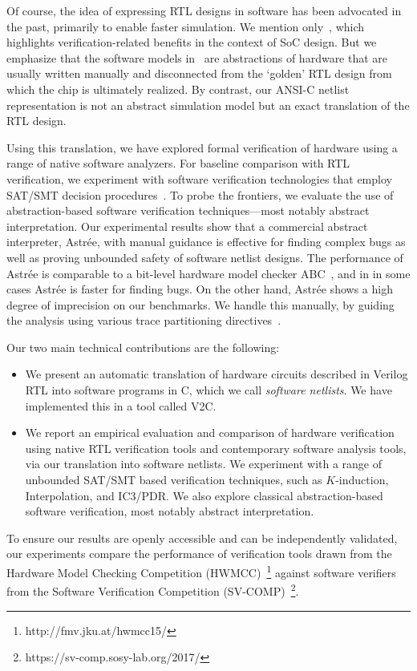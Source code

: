 Of course, the idea of expressing RTL designs in software has been  advocated in the past, primarily to enable faster simulation. We mention only~\cite{soc-keating}, which highlights verification-related benefits in the context of SoC design.  But we emphasize that the software models in~\cite{soc-keating} are abstractions of hardware that are usually written manually and disconnected from the `golden' RTL design  from which the chip is ultimately realized.  By contrast, our ANSI-C netlist representation is not an abstract simulation model but an exact translation of the RTL design.

Using this translation, we have explored formal verification of hardware using a range of 
native software analyzers.  For baseline comparison with RTL verification, we experiment with software verification technologies that employ SAT/SMT decision procedures~\cite{DBLP:conf/cav/BeyerK11,2ls,cbmc.tacas:2004,DBLP:conf/tacas/HeizmannDGLMSP16}. To 
probe the frontiers, we evaluate the use of abstraction-based software verification 
techniques---most notably abstract interpretation. Our experimental results show that a commercial abstract interpreter,  Astr{\'e}e, with manual guidance is effective for finding complex bugs 
as well as proving unbounded safety of software netlist designs. The performance of Astr{\'e}e is 
comparable to a bit-level hardware model checker ABC~\cite{abc}, and in 
in some cases Astr{\'e}e is faster for finding bugs.  On the other hand, 
Astr{\'e}e shows a high degree of imprecision on our benchmarks. We handle this 
manually, by guiding the analysis using various trace 
partitioning directives~\cite{DBLP:journals/toplas/RivalM07}.  

Our two main technical contributions are the following:
%
\begin{itemize}
\item We present an automatic translation of hardware circuits described in Verilog RTL into software 
programs in C, which we call \textit{software netlists}.  We have implemented this in a tool called V2C.  

\item We report an empirical evaluation and comparison of hardware verification using native RTL verification tools and contemporary software analysis tools, via our translation into software netlists. 
We experiment with a range of unbounded SAT/SMT based verification techniques, 
such as $K$-induction, Interpolation, and IC3/PDR. We also explore classical abstraction-based 
software verification, most notably abstract interpretation.
\end{itemize}

\noindent To ensure our results are openly accessible and can be independently validated, our experiments compare the performance of verification tools drawn from  the Hardware Model Checking Competition (HWMCC)~\footnote{http://fmv.jku.at/hwmcc15/} against software verifiers from the Software Verification Competition (SV-COMP)~\footnote{https://sv-comp.sosy-lab.org/2017/}.
